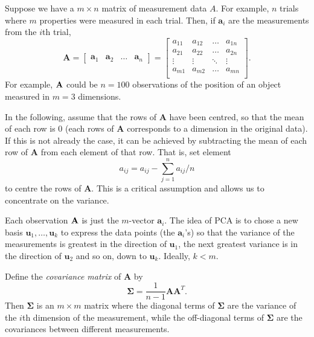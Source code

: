 Suppose we have a  $m \times n$ matrix of measurement data $A$.  For example, $n$ trials where $m$ properties were measured in each trial.  Then, if $\mathbf a_i$ are the measurements from the $i$th trial,  
\[
\mathbf{A} = \left[\begin{array}{cccc}\mathbf{a}_1 & \mathbf{a}_2 & \ldots & \mathbf{a}_n \end{array}\right]
= \left[\begin{array}{cccc}
a_{11} & a_{12} & \ldots & a_{1n}\\
a_{21} & a_{22} & \ldots & a_{2n}\\
\vdots  &  \vdots & \ddots & \vdots \\
a_{m1} & a_{m2} & \ldots & a_{mn}\\
 \end{array}\right].
\]
For example, $\bf A$ could be $n = 100$ observations of the position of an object measured in $m = 3$ dimensions.

In the following, assume that the rows of $\mathbf A$ have been centred, so that the mean of each row is 0 (each rows of $\mathbf A$  corresponds to a dimension in the original data). If this is not already the case, it can be achieved by subtracting the mean of each row of $\mathbf A$ from each element of that row. That is, set element  \[a_{ij} = a_{ij}- \sum_{j = 1}^n a_{ij}/n\] to centre the rows of $\mathbf A$.  This is a critical assumption and allows us to concentrate on the variance. 

Each observation $\bf A$ is just the $m$-vector $\mathbf a_i$. The idea of PCA is to chose a new basis $\mathbf u_1, \ldots, \mathbf u_k$ to express the data points (the $\mathbf a_i$'s) so that the variance of the measurements  is greatest in the direction of $\mathbf u_1$, the next greatest variance is in the direction of $\mathbf u_2$ and so on, down to $\mathbf u_k$.  Ideally, $k < m$.

Define the {\em covariance matrix} of $\mathbf A$ by 
\[\mathbf \Sigma = \frac 1 {n-1} \mathbf {AA}^T. \] %
Then $\mathbf \Sigma$ is an $m \times m$ matrix where the diagonal terms of $\mathbf \Sigma $ are the variance of the $i$th dimension of the measurement, while the off-diagonal terms of $\mathbf \Sigma $ are the covariances between different measurements.  

